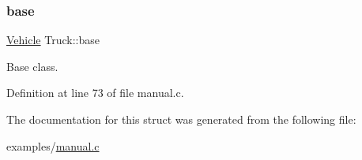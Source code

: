 \subsubsection{\texorpdfstring{base}{base}}
{\footnotesize\ttfamily \mbox{\hyperlink{struct_vehicle}{Vehicle}} Truck\+::base\hspace{0.3cm}{\ttfamily [protected]}}



Base class. 



Definition at line 73 of file manual.\+c.



The documentation for this struct was generated from the following file\+:\begin{DoxyCompactItemize}
\item 
examples/\mbox{\hyperlink{manual_8c}{manual.\+c}}\end{DoxyCompactItemize}
